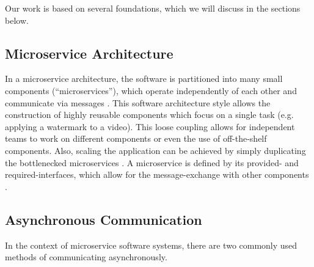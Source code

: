 Our work is based on several foundations, which we will discuss in the sections below.

\subsection{Microservice Architecture}
\label{sec:Foundation:MicroserviceArchitecture}
In a microservice architecture, the software is partitioned into many small components (``microservices''), which operate independently of each other and communicate via messages \cite{Dragoni2017}.
This software architecture style allows the construction of highly reusable components which focus on a single task (e.g. applying a watermark to a video).
This loose coupling allows for independent teams to work on different components or even the use of off-the-shelf components.
Also, scaling the application can be achieved by simply duplicating the bottlenecked microservices \cite{Dragoni2017}.
A microservice is defined by its provided- and required-interfaces, which allow for the message-exchange with other components \cite{Singh2021}.

\subsection{Asynchronous Communication}
\label{sec:Foundation:AsyncCommunication}
In the context of microservice software systems, there are two commonly used methods of communicating asynchronously.

